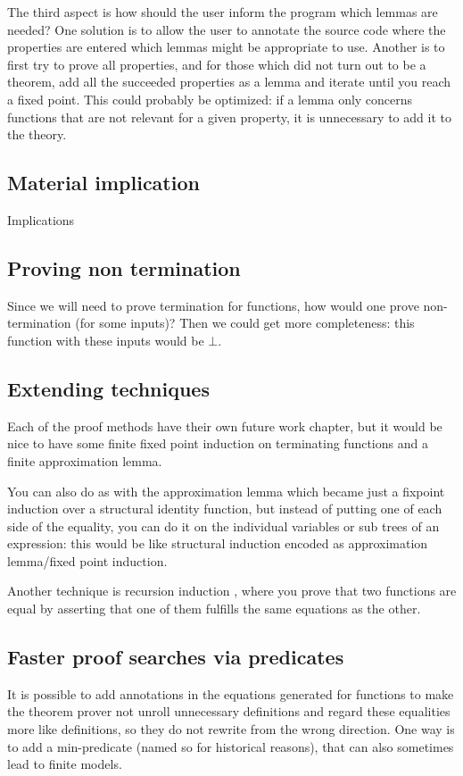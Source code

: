 The third aspect is how should the user inform the program which
lemmas are needed? One solution is to allow the user to annotate the
source code where the properties are entered which lemmas might be
appropriate to use. Another is to first try to prove all properties,
and for those which did not turn out to be a theorem, add all the
succeeded properties as a lemma and iterate until you reach a fixed
point. This could probably be optimized: if a lemma only concerns
functions that are not relevant for a given property, it is
unnecessary to add it to the theory.

\subsection{Material implication}

Implications

\subsection{Proving non termination}

Since we will need to prove termination for functions, how would one
prove non-termination (for some inputs)? Then we could get more
completeness: this function with these inputs would be $\bot$.

\subsection{Extending techniques}

Each of the proof methods have their own future work chapter, but it
would be nice to have some finite fixed point induction on terminating
functions and a finite approximation lemma.

You can also do as with the approximation lemma which became just a
fixpoint induction over a structural identity function, but instead of
putting one of each side of the equality, you can do it on the
individual variables or sub trees of an expression: this would be like
structural induction encoded as approximation lemma/fixed point induction.

Another technique is recursion induction \cite{recind}, where you
prove that two functions are equal by asserting that one of them
fulfills the same equations as the other.


\subsection{Faster proof searches via predicates}

It is possible to add annotations in the equations generated for
functions to make the theorem prover not unroll unnecessary
definitions and regard these equalities more like definitions, so they
do not rewrite from the wrong direction. One way is to add a
min-predicate (named so for historical reasons), that can also
sometimes lead to finite models.

